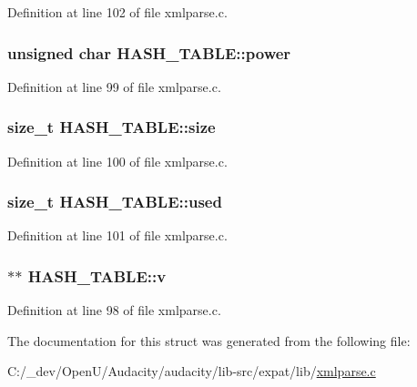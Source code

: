 Definition at line 102 of file xmlparse.\+c.

\subsubsection[{\texorpdfstring{power}{power}}]{\setlength{\rightskip}{0pt plus 5cm}unsigned char H\+A\+S\+H\+\_\+\+T\+A\+B\+L\+E\+::power}\hypertarget{struct_h_a_s_h___t_a_b_l_e_a4d30d7fa766cca964c0963e9baf55b6e}{}\label{struct_h_a_s_h___t_a_b_l_e_a4d30d7fa766cca964c0963e9baf55b6e}


Definition at line 99 of file xmlparse.\+c.

\subsubsection[{\texorpdfstring{size}{size}}]{\setlength{\rightskip}{0pt plus 5cm}size\+\_\+t H\+A\+S\+H\+\_\+\+T\+A\+B\+L\+E\+::size}\hypertarget{struct_h_a_s_h___t_a_b_l_e_ad99578795ef74ec574a9e88b746fb4a4}{}\label{struct_h_a_s_h___t_a_b_l_e_ad99578795ef74ec574a9e88b746fb4a4}


Definition at line 100 of file xmlparse.\+c.

\subsubsection[{\texorpdfstring{used}{used}}]{\setlength{\rightskip}{0pt plus 5cm}size\+\_\+t H\+A\+S\+H\+\_\+\+T\+A\+B\+L\+E\+::used}\hypertarget{struct_h_a_s_h___t_a_b_l_e_a7cb555fdf2da3a7b13e2cc70e02b70b5}{}\label{struct_h_a_s_h___t_a_b_l_e_a7cb555fdf2da3a7b13e2cc70e02b70b5}


Definition at line 101 of file xmlparse.\+c.

\subsubsection[{\texorpdfstring{v}{v}}]{$\ast$$\ast$ H\+A\+S\+H\+\_\+\+T\+A\+B\+L\+E\+::v}\hypertarget{struct_h_a_s_h___t_a_b_l_e_a3836fe57566c4811985429bb9a8ade9b}{}\label{struct_h_a_s_h___t_a_b_l_e_a3836fe57566c4811985429bb9a8ade9b}


Definition at line 98 of file xmlparse.\+c.



The documentation for this struct was generated from the following file\+:\begin{DoxyCompactItemize}
\item 
C\+:/\+\_\+dev/\+Open\+U/\+Audacity/audacity/lib-\/src/expat/lib/\hyperlink{xmlparse_8c}{xmlparse.\+c}\end{DoxyCompactItemize}
